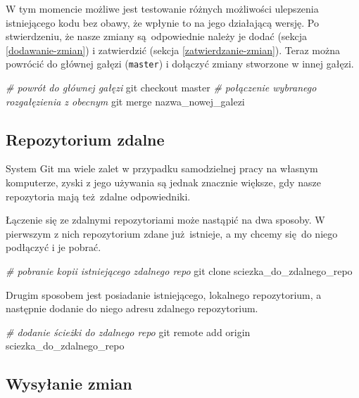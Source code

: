 \documentclass[paper=6in:9in,pagesize=pdftex,headinclude=on,footinclude=on,10pt]{scrbook}
\newenvironment{Shaded}{\begin{snugshade}}{\end{snugshade}}
\newcommand{\CommentTok}[1]{\textcolor[rgb]{0.56,0.35,0.01}{\textit{#1}}}
\newcommand{\FunctionTok}[1]{\textcolor[rgb]{0.00,0.00,0.00}{#1}}
\newcommand{\NormalTok}[1]{#1}
\begin{document}
W tym momencie możliwe jest testowanie różnych możliwości ulepszenia istniejącego kodu bez obawy, że wpłynie to na jego działającą wersję.
Po stwierdzeniu, że nasze zmiany są~odpowiednie należy je dodać (sekcja \ref{dodawanie-zmian}) i zatwierdzić (sekcja \ref{zatwierdzanie-zmian}).
Teraz można powrócić do głównej gałęzi (\texttt{master}) i dołączyć zmiany stworzone w innej gałęzi.

\begin{Shaded}
\begin{Highlighting}[]
\CommentTok{# powrót do głównej gałęzi}
\FunctionTok{git}\NormalTok{ checkout master}
\CommentTok{# połączenie wybranego rozgałęzienia z obecnym}
\FunctionTok{git}\NormalTok{ merge nazwa_nowej_galezi}
\end{Highlighting}
\end{Shaded}

\hypertarget{repozytorium-zdalne}{%
\subsection{Repozytorium zdalne}\label{repozytorium-zdalne}}

System Git ma wiele zalet w przypadku samodzielnej pracy na własnym komputerze, zyski z jego używania są jednak znacznie większe, gdy nasze repozytoria mają też~zdalne odpowiedniki.

Łączenie się ze zdalnymi repozytoriami może nastąpić na dwa sposoby.
W pierwszym z nich repozytorium zdane już~istnieje, a my chcemy się~do niego podłączyć i je pobrać.

\begin{Shaded}
\begin{Highlighting}[]
\CommentTok{# pobranie kopii istniejącego zdalnego repo}
\FunctionTok{git}\NormalTok{ clone sciezka_do_zdalnego_repo}
\end{Highlighting}
\end{Shaded}

Drugim sposobem jest posiadanie istniejącego, lokalnego repozytorium, a następnie dodanie do niego adresu zdalnego repozytorium.

\begin{Shaded}
\begin{Highlighting}[]
\CommentTok{# dodanie ścieżki do zdalnego repo}
\FunctionTok{git}\NormalTok{ remote add origin sciezka_do_zdalnego_repo}
\end{Highlighting}
\end{Shaded}

\hypertarget{wysylanie-zmian}{%
\subsection{Wysyłanie zmian}\label{wysylanie-zmian}}
\end{document}
